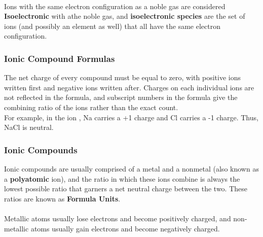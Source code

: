 \noindent
{} \\

\noindent
Ions with the same electron configuration as a noble gas are considered \textbf{Isoelectronic} with athe noble gas, and \textbf{isoelectronic species} are the set of ions (and possibly an element as well) that all have the same electron configuration.

\subsubsection{Ionic Compound Formulas}

The net charge of every compound must be equal to zero, with positive ions written first and negative ions written after. Charges on each individual ions are not reflected in the formula, and subscript numbers in the formula give the combining ratio of the ions rather than the exact count. \\

\noindent
For example, in the ion , Na carries a +1 charge and Cl carries a -1 charge. Thus, NaCl is neutral. 

\subsubsection{Ionic Compounds}

Ionic compounds are usually comprised of a metal and a nonmetal (also known as a \textbf{polyatomic} ion), and the ratio in which these ions combine is always the lowest possible ratio that garners a net neutral charge between the two. These ratios are known as \textbf{Formula Units}. \\

\noindent
{} \\

\noindent
Metallic atoms usually lose electrons and become positively charged, and non-metallic atoms usually gain electrons and become negatively charged.


